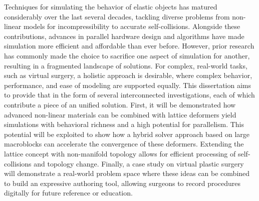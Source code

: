 
Techniques for simulating the behavior of elastic objects has matured
considerably over the last several decades, tackling diverse problems
from non-linear models for incompressibility to accurate
self-collisions. Alongside these contributions, advances in parallel
hardware design and algorithms have made simulation more efficient and
affordable than ever before. However, prior research has commonly made
the choice to sacrifice one aspect of simulation for another,
resulting in a fragmented landscape of solutions. For complex,
real-world tasks, such as virtual surgery, a holistic approach is
desirable, where complex behavior, performance, and ease of modeling
are supported equally. This dissertation aims to provide that in the
form of several interconnected investigations, each of which
contribute a piece of an unified solution. First, it will be
demonstrated how advanced non-linear materials can be combined with
lattice deformers yield simulations with behavioral richness and a
high potential for parallelism. This potential will be exploited to
show how a hybrid solver approach based on large macroblocks can
accelerate the convergence of these deformers. Extending the lattice
concept with non-manifold topology allows for efficient processing of
self-collisions and topology change. Finally, a case study on virtual
plastic surgery will demonstrate a real-world problem space where
these ideas can be combined to build an expressive authoring tool,
allowing surgeons to record procedures digitally for future reference
or education.


